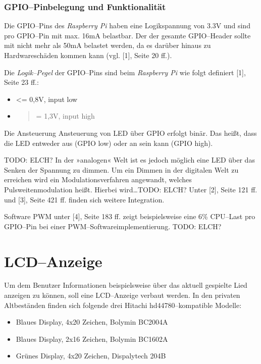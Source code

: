 \documentclass[11pt,ngerman,toc=listof,index=totoc]{scrreprt}
\providecommand{\tightlist}{%
  \setlength{\itemsep}{0pt}\setlength{\parskip}{0pt}}
\begin{document}
\subsubsection{GPIO--Pinbelegung und
Funktionalität}\label{gpiopinbelegung-und-funktionalituxe4t}

Die GPIO--Pins des \emph{Raspberry Pi} haben eine Logikspannung von 3.3V
und sind pro GPIO--Pin mit max. 16mA belastbar. Der der gesamte
GPIO--Header sollte mit nicht mehr als 50mA belastet werden, da es
darüber hinaus zu Hardwareschäden kommen kann (vgl. {[}1{]}, Seite 20
ff.).

Die \emph{Logik--Pegel} der GPIO--Pins sind beim \emph{Raspberry Pi} wie
folgt definiert {[}1{]}, Seite 23 ff.:

\begin{itemize}
\item
  \textless{}= 0,8V, input low
\item
  \begin{quote}
  = 1,3V, input high
  \end{quote}
\end{itemize}

Die Ansteuerung Ansteuerung von LED über GPIO erfolgt binär. Das heißt,
dass die LED entweder aus (GPIO low) oder an sein kann (GPIO high).

TODO: ELCH? In der »analogen« Welt ist es jedoch möglich eine LED über
das Senken der Spannung zu dimmen. Um ein Dimmen in der digitalen Welt
zu erreichen wird ein Modulationsverfahren angewandt, welches
Pulsweitenmodulation heißt. Hierbei wird\ldots{}TODO: ELCH? Unter
{[}2{]}, Seite 121 ff. und {[}3{]}, Seite 421 ff. finden sich weitere
Integration.

Software PWM unter {[}4{]}, Seite 183 ff. zeigt beispielsweise eine 6\%
CPU--Last pro GPIO--Pin bei einer PWM--Softwareimplementierung. TODO:
ELCH?

\section{LCD--Anzeige}\label{lcdanzeige}

Um dem Benutzer Informationen beispielsweise über das aktuell gespielte
Lied anzeigen zu können, soll eine LCD--Anzeige verbaut werden. In den
privaten Altbeständen finden sich folgende drei Hitachi
hd44780--kompatible Modelle:

\begin{itemize}
\tightlist
\item
  Blaues Display, 4x20 Zeichen, Bolymin BC2004A
\item
  Blaues Display, 2x16 Zeichen, Bolymin BC1602A
\item
  Grünes Display, 4x20 Zeichen, Dispalytech 204B
\end{itemize}
\end{document}
